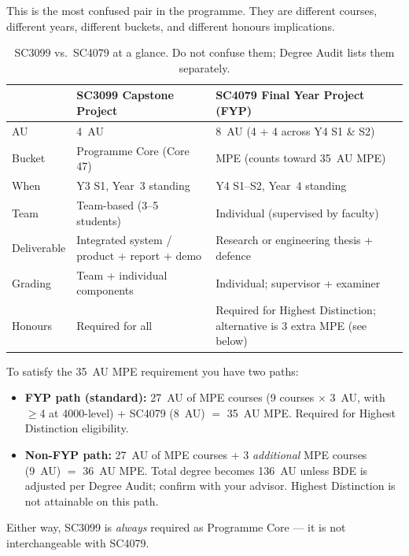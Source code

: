 This is the most confused pair in the programme. They are different courses, different years, different buckets, and different honours implications.

\begin{table}[h]
\centering
\small
\renewcommand{\arraystretch}{1.25}
\begin{tabular}{@{}p{3.2cm} p{4.7cm} p{4.7cm}@{}}
\toprule
 & \textbf{SC3099 Capstone Project} & \textbf{SC4079 Final Year Project (FYP)} \\
\midrule
AU & 4~AU & 8~AU (4 + 4 across Y4 S1 \& S2) \\
Bucket & Programme Core (Core 47) & MPE (counts toward 35~AU MPE) \\
When & Y3 S1, Year~3 standing & Y4 S1--S2, Year~4 standing \\
Team & Team-based (3--5 students) & Individual (supervised by faculty) \\
Deliverable & Integrated system / product + report + demo & Research or engineering thesis + defence \\
Grading & Team + individual components & Individual; supervisor + examiner \\
Honours & Required for all & Required for Highest Distinction; alternative is 3 extra MPE (see below) \\
\bottomrule
\end{tabular}
\caption{SC3099 vs.\ SC4079 at a glance. Do not confuse them; Degree Audit lists them separately.}
\label{tab:capstone-vs-fyp}
\end{table}

\begin{remark}
To satisfy the 35~AU MPE requirement you have two paths:
\begin{itemize}
    \item \textbf{FYP path (standard):} 27~AU of MPE courses (9 courses $\times$ 3~AU, with $\ge$4 at 4000-level) + SC4079 (8~AU) $=$ 35~AU MPE. Required for Highest Distinction eligibility.
    \item \textbf{Non-FYP path:} 27~AU of MPE courses + 3 \emph{additional} MPE courses (9~AU) $=$ 36~AU MPE. Total degree becomes 136~AU unless BDE is adjusted per Degree Audit; confirm with your advisor. Highest Distinction is not attainable on this path.
\end{itemize}
Either way, SC3099 is \emph{always} required as Programme Core --- it is not interchangeable with SC4079.
\end{remark}

